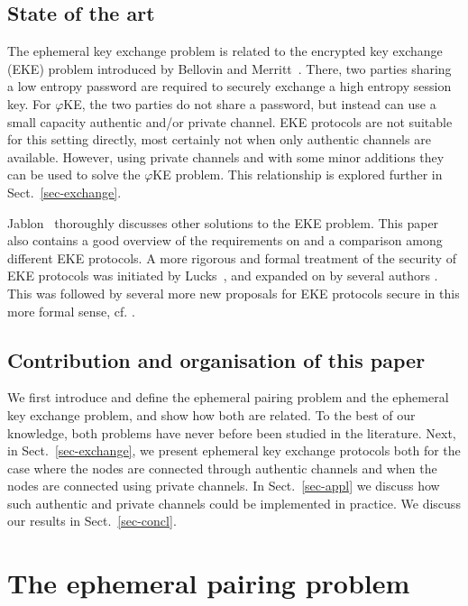 \documentclass[runningheads,envcountsame,envcountsect,oribibl]{llncs}
\newcommand{\eke}{$\varphi$KE}
\begin{document}
\subsection{State of the art}

The ephemeral key exchange problem is related to the encrypted key exchange
(EKE) problem introduced by Bellovin and Merritt~\cite{BelM92,BelM93}. There,
two parties sharing a low entropy password are required to securely exchange a
high entropy session key. For \eke{}, the two parties do not share a password,
but instead can use a small capacity authentic and/or private channel. EKE
protocols are not suitable for this setting directly, most certainly not
when only authentic channels are available. However, using private channels and
with some minor additions they can be used to solve the \eke{} problem.
This relationship is explored further in Sect.~\ref{sec-exchange}.

Jablon~\cite{Jab96} thoroughly discusses other solutions to the EKE problem.
This paper also contains a good overview of the
requirements on and a comparison among different EKE protocols.
A more rigorous and formal treatment of the security of EKE protocols was
initiated by Lucks~\cite{Luc97}, and expanded on by several authors
\cite{BoyMP00,BelPR00,Sho99,CanK01,GenL03}. This was followed by several 
more new proposals for EKE protocols secure in this more formal sense, cf. 
\cite{Mac01a,KatOY01}.


\subsection{Contribution and organisation of this paper}

We first introduce and define the ephemeral pairing problem and the ephemeral
key exchange problem, and show how both are related. To the best of our
knowledge, both problems have never before been studied in the literature.
Next, in Sect.~\ref{sec-exchange}, we present ephemeral
key exchange protocols both for the case where the nodes are connected through
authentic channels and when the nodes are connected using private channels.
In Sect.~\ref{sec-appl} we discuss how such authentic and private channels 
could be implemented in practice.
We discuss our results in Sect.~\ref{sec-concl}.

\section{The ephemeral pairing problem}
\end{document}
